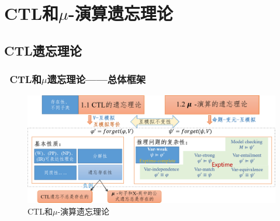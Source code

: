 \documentclass[9pt, CJK]{beamer}
\begin{document}
\section{CTL和$\mu$-演算遗忘理论}
\subsection{CTL遗忘理论}  
\begin{frame}  
	\frametitle{~CTL和$\mu$遗忘理论——{\footnotesize 总体框架}}
	\begin{figure}
		\includegraphics[scale=0.35]{figures/ctlMuForgFrame}
		\caption{CTL和$\mu$-演算遗忘理论}
	\end{figure}
\end{frame}
		
\end{document}
